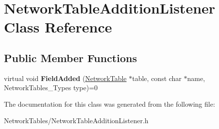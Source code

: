 \hypertarget{classNetworkTableAdditionListener}{
\section{NetworkTableAdditionListener Class Reference}
\label{classNetworkTableAdditionListener}
}
\subsection*{Public Member Functions}
\begin{DoxyCompactItemize}
\item 
\hypertarget{classNetworkTableAdditionListener_ae80211b0b65e064dfdf41d50c6089b04}{
virtual void {\bfseries FieldAdded} (\hyperlink{classNetworkTable}{NetworkTable} $\ast$table, const char $\ast$name, NetworkTables\_\-Types type)=0}
\label{classNetworkTableAdditionListener_ae80211b0b65e064dfdf41d50c6089b04}

\end{DoxyCompactItemize}


The documentation for this class was generated from the following file:\begin{DoxyCompactItemize}
\item 
NetworkTables/NetworkTableAdditionListener.h\end{DoxyCompactItemize}
